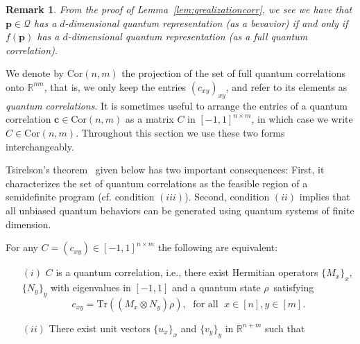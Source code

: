 \documentclass{siamart}
\newtheorem{remark}{Remark}[section]
\begin{document}
{\medskip 
\begin{remark}\label{rem:equivalencebetweenrepresentations}
{From the proof of Lemma~\ref{lem:qrealizationcorr}, we see we have that ${\mathbf{p}}\in {\mathcal{Q}}$ has a $d$-dimensional quantum representation (as a bevavior) if and only if $f({\mathbf{p}})$ has a $d$-dimensional quantum representation (as a full quantum correlation).}
\end{remark}
\medskip

We denote by ${\mathrm{Cor}(n,m)}$  the   projection of the set of full quantum
correlations onto ${\mathbb{R}}^{nm}$, {that is, {we only keep}  the entries
$(c_{xy})_{xy}$,} and refer to its elements as  {\em quantum
correlations}. It is  sometimes  useful   to arrange the entries of
a quantum correlation ${\mathbf{c}} \in {\mathrm{Cor}(n,m)}$ as a {matrix $C$} in
$[-1,1]^{n\times m}$, in which case we write $C\in {\mathrm{Cor}(n,m)}$.
Throughout this section  we use these two  forms interchangeably.

Tsirelson's theorem~\cite{TS87} given below  has two important   consequences: First, it  characterizes the set  of quantum correlations as the feasible region of a semidefinite  program (cf. condition $(iii)$). {Second},  condition $(ii)$ implies
that all unbiased quantum behaviors can be generated using quantum systems of finite dimension.

\medskip 

\begin{theorem}[\cite{TS87}]\label{thm:tsirelson1} For any  $C=(c_{xy})\in [-1,1]^{n\times m}$ the  following are equivalent:
\vspace{0.01cm}
\begin{itemize}

\item[$(i)$] {$C$ is a quantum correlation, i.e.,} there exist Hermitian operators
 $\{M_x\}_{x}$, $\{N_y\}_{y}$ with eigenvalues in $[-1,1]$ and  a quantum state $\rho$~satisfying
$$c_{xy}={\mathrm{Tr}}((M_x\otimes N_y)\rho), \; \text{ for all } \; x\in [n], y\in [m].$$

\item[$(ii)$] There exist unit vectors $\{u_x\}_x$ and $\{v_y\}_{y}$ in ${\mathbb{R}}^{n+m}$ such that
\vspace{0.1cm}


\end{itemize}
\end{theorem}}
\end{document}
